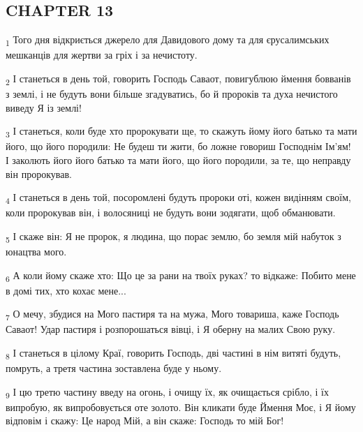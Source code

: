 \subsection{CHAPTER 13}
\begin{tcolorbox}
\textsubscript{1} Того дня відкриється джерело для Давидового дому та для єрусалимських мешканців для жертви за гріх і за нечистоту.
\end{tcolorbox}
\begin{tcolorbox}
\textsubscript{2} І станеться в день той, говорить Господь Саваот, повигублюю ймення бовванів з землі, і не будуть вони більше згадуватись, бо й пророків та духа нечистого виведу Я із землі!
\end{tcolorbox}
\begin{tcolorbox}
\textsubscript{3} І станеться, коли буде хто пророкувати ще, то скажуть йому його батько та мати його, що його породили: Не будеш ти жити, бо ложне говориш Господнім Ім'ям! І заколють його його батько та мати його, що його породили, за те, що неправду він пророкував.
\end{tcolorbox}
\begin{tcolorbox}
\textsubscript{4} І станеться в день той, посоромлені будуть пророки оті, кожен видінням своїм, коли пророкував він, і волосяниці не будуть вони зодягати, щоб обманювати.
\end{tcolorbox}
\begin{tcolorbox}
\textsubscript{5} І скаже він: Я не пророк, я людина, що порає землю, бо земля мій набуток з юнацтва мого.
\end{tcolorbox}
\begin{tcolorbox}
\textsubscript{6} А коли йому скаже хто: Що це за рани на твоїх руках? то відкаже: Побито мене в домі тих, хто кохає мене...
\end{tcolorbox}
\begin{tcolorbox}
\textsubscript{7} О мечу, збудися на Мого пастиря та на мужа, Мого товариша, каже Господь Саваот! Удар пастиря і розпорошаться вівці, і Я оберну на малих Свою руку.
\end{tcolorbox}
\begin{tcolorbox}
\textsubscript{8} І станеться в цілому Краї, говорить Господь, дві частині в нім витяті будуть, помруть, а третя частина зоставлена буде у ньому.
\end{tcolorbox}
\begin{tcolorbox}
\textsubscript{9} І цю третю частину введу на огонь, і очищу їх, як очищається срібло, і їх випробую, як випробовується оте золото. Він кликати буде Ймення Моє, і Я йому відповім і скажу: Це народ Мій, а він скаже: Господь то мій Бог!
\end{tcolorbox}
